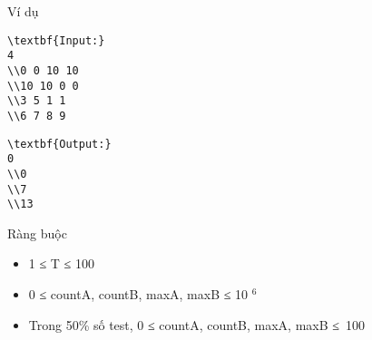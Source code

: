 Ví dụ
\begin{verbatim}
\textbf{Input:}
4
\\0 0 10 10
\\10 10 0 0
\\3 5 1 1
\\6 7 8 9 \end{verbatim}
\begin{verbatim}
\textbf{Output:}
0
\\0
\\7
\\13 \end{verbatim}
Ràng buộc
\begin{itemize}
	\item     1 ≤ T ≤ 100   
	\item     0 ≤ countA, countB, maxA, maxB ≤ 10    $^     6    $
	\item     Trong 50\% số test, 0 ≤ countA, countB, maxA, maxB ≤ 100   
\end{itemize}